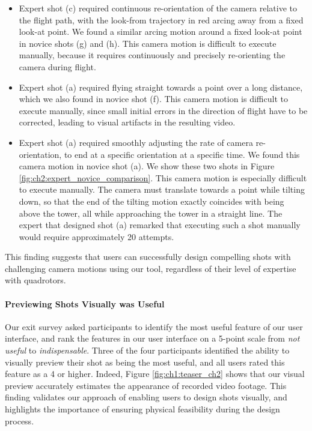 \begin{itemize}

\item
Expert shot (c) required continuous re-orientation of the camera relative to the flight path, with the look-from trajectory in red arcing away from a fixed look-at point.
We found a similar arcing motion around a fixed look-at point in novice shots (g) and (h).
This camera motion is difficult to execute manually, because it requires continuously and precisely re-orienting the camera during flight.

\item
Expert shot (a) required flying straight towards a point over a long distance, which we also found in novice shot (f).
This camera motion is difficult to execute manually, since small initial errors in the direction of flight have to be corrected, leading to visual artifacts in the resulting video.

\item
Expert shot (a) required smoothly adjusting the rate of camera re-orientation, to end at a specific orientation at a specific time.
We found this camera motion in novice shot (a).
We show these two shots in Figure \ref{fig:ch2:expert_novice_comparison}.
This camera motion is especially difficult to execute manually.
The camera must translate towards a point while tilting down, so that the end of the tilting motion exactly coincides with being above the tower, all while approaching the tower in a straight line.
The expert that designed shot (a) remarked that executing such a shot manually would require approximately 20 attempts.

\end{itemize}

This finding suggests that users can successfully design compelling shots with challenging camera motions using our tool, regardless of their level of expertise with quadrotors.

\paragraph{Previewing Shots Visually was Useful}
Our exit survey asked participants to identify the most useful feature of our user interface, and rank the features in our user interface on a 5-point scale from \emph{not useful} to \emph{indispensable}.
Three of the four participants identified the ability to visually preview their shot as being the most useful, and all users rated this feature as a 4 or higher.
Indeed, Figure \ref{fig:ch1:teaser_ch2} shows that our visual preview accurately estimates the appearance of recorded video footage.
This finding validates our approach of enabling users to design shots visually, and highlights the importance of ensuring physical feasibility during the design process.

